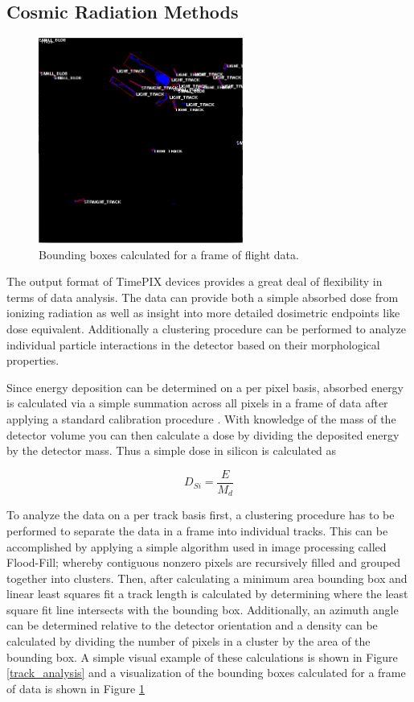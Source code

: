 \subsection{Cosmic Radiation Methods}
\label{sec:Rad-Methods}

\begin{figure}[H]
	\begin{center}
	\includegraphics[width=0.6\textwidth]{figures/clustering.png}
	\caption{Bounding boxes calculated for a frame of flight data.}
	\label{clusterframe}
	\end{center}
\end{figure}

The output format of TimePIX devices provides a great deal of flexibility in terms of data analysis. The data can provide both a simple absorbed dose from ionizing radiation as well as insight into more detailed dosimetric endpoints like dose equivalent. Additionally a clustering procedure can be performed to analyze individual particle interactions in the detector based on their morphological properties.

 Since energy deposition can be determined on a per pixel basis, absorbed energy is calculated via a simple summation across all pixels in a frame of data after applying a standard calibration procedure \cite{mpjakubek}. With knowledge of the mass of the detector volume you can then calculate a dose by dividing the deposited energy by the detector mass. Thus a simple dose in silicon is calculated as

\[D_{Si} = \frac{E}{M_{d}}\]


To analyze the data on a per track basis first, a clustering procedure has to be performed to separate the data in a frame into individual tracks. This can be accomplished by applying a simple algorithm used in image processing called Flood-Fill; whereby contiguous nonzero pixels are recursively filled and grouped together into clusters. Then, after calculating a minimum area bounding box and linear least squares fit a track length is calculated by determining where the least square fit line intersects with the bounding box. Additionally, an azimuth angle can be determined relative to the detector orientation and a density can be calculated by dividing the number of pixels in a cluster by the area of the bounding box. A simple visual example of these calculations is shown in Figure \ref{track_analysis} and a visualization of the bounding boxes calculated for a frame of data is shown in Figure \ref{clusterframe}



